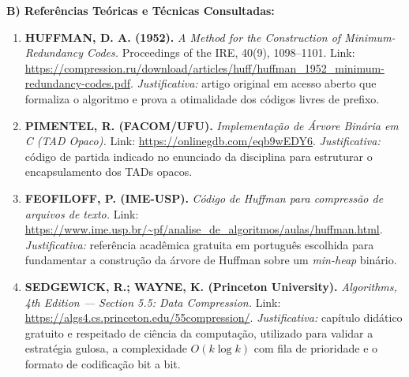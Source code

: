 \documentclass[a4paper,10pt]{article}
\begin{document}
\textbf{B) Referências Teóricas e Técnicas Consultadas:}
\begin{enumerate}\setlength{\itemsep}{1pt}\setlength{\parskip}{0pt}\setlength{\topsep}{2pt}
  \item \textbf{HUFFMAN, D. A. (1952).} \emph{A Method for the Construction of Minimum-Redundancy Codes.} Proceedings of the IRE, 40(9), 1098--1101. Link: \url{https://compression.ru/download/articles/huff/huffman_1952_minimum-redundancy-codes.pdf}. \emph{Justificativa:} artigo original em acesso aberto que formaliza o algoritmo e prova a otimalidade dos códigos livres de prefixo.
  \item \textbf{PIMENTEL, R. (FACOM/UFU).} \emph{Implementação de Árvore Binária em C (TAD Opaco).} Link: \url{https://onlinegdb.com/eqb9wEDY6}. \emph{Justificativa:} código de partida indicado no enunciado da disciplina para estruturar o encapsulamento dos TADs opacos.
  \item \textbf{FEOFILOFF, P. (IME-USP).} \emph{Código de Huffman para compressão de arquivos de texto.} Link: \url{https://www.ime.usp.br/~pf/analise_de_algoritmos/aulas/huffman.html}. \emph{Justificativa:} referência acadêmica gratuita em português escolhida para fundamentar a construção da árvore de Huffman sobre um \emph{min-heap} binário.
  \item \textbf{SEDGEWICK, R.; WAYNE, K. (Princeton University).} \emph{Algorithms, 4th Edition --- Section 5.5: Data Compression.} Link: \url{https://algs4.cs.princeton.edu/55compression/}. \emph{Justificativa:} capítulo didático gratuito e respeitado de ciência da computação, utilizado para validar a estratégia gulosa, a complexidade $O(k \log k)$ com fila de prioridade e o formato de codificação bit a bit.
\end{enumerate}
\end{document}

